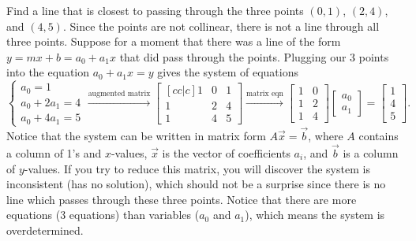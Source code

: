 \begin{example}\label{regression1ex}
Find a line that is closest to passing through the three points $(0,1)$, $(2,4)$, and $(4,5)$.  Since the points are not collinear, there is not a line through all three points.  Suppose for a moment that there was a line of the form $y=mx+b=a_0+a_1x$ that did pass through the points. Plugging our 3 points into the equation $a_0+a_1x=y$ gives the system of equations 
$$\begin{cases}a_0=1\\a_0+2a_1=4\\a_0+4a_1=5\end{cases}
\xrightarrow{\text{augmented matrix}}
\begin{bmatrix}[cc|c]1&0&1\\1&2&4\\1&4&5\end{bmatrix}
\xrightarrow{\text{matrix eqn}}
\begin{bmatrix}1&0\\1&2\\1&4\end{bmatrix}
\begin{bmatrix}a_0\\a_1\end{bmatrix}
=\begin{bmatrix}1\\4\\5\end{bmatrix}.
$$
Notice that the system can be written in matrix form $A\vec x = \vec b$, where $A$ contains a column of 1's and $x$-values, $\vec x$ is the vector of coefficients $a_i$, and $\vec b$ is a column of $y$-values. 
If you try to reduce this matrix, you will discover the system is inconsistent (has no solution), which should not be a surprise since there is no line which passes through these three points. 
Notice that there are more equations (3 equations) than variables ($a_0$ and $a_1$), which means the system is overdetermined.


\end{example}

